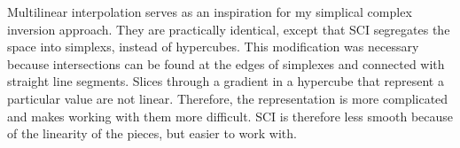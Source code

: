 Multilinear interpolation serves as an inspiration for my simplical complex inversion approach.
They are practically identical, except that SCI segregates the space into simplexs, instead of hypercubes.
This modification was necessary because intersections can be found at the edges of simplexes and connected with straight line segments.
Slices through a gradient in a hypercube that represent a particular value are not linear.
Therefore, the representation is more complicated and makes working with them more difficult.
SCI is therefore less smooth because of the linearity of the pieces, but easier to work with.







